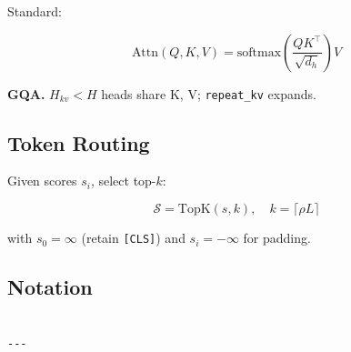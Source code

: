 Standard:

\[
\text{Attn}(Q, K, V) = \text{softmax}\!\left(\frac{QK^\top}{\sqrt{d_h}}\right) V
\tag{3.6}
\]

\textbf{GQA.} $H_{kv} < H$ heads share K, V; \texttt{repeat\_kv} expands.

\subsection{Token Routing}

Given scores $s_i$, select top-$k$:

\[
\mathcal{S} = \text{TopK}(s, k), \quad k = \lceil \rho L \rceil
\tag{3.7}
\]

with $s_0 = \infty$ (retain \texttt{[CLS]}) and $s_i = -\infty$ for padding.

\subsection{Notation}

\begin{lstlisting}

---
\end{lstlisting}